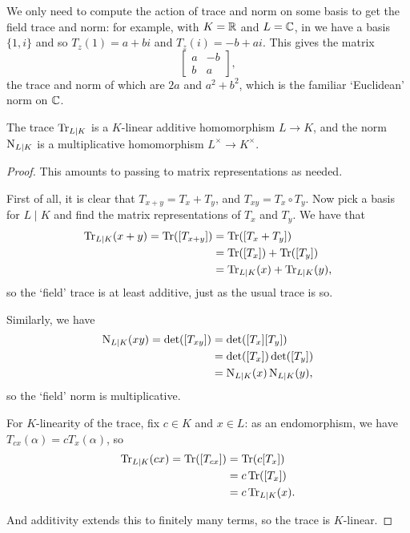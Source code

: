 We only need to compute the action of trace and norm on some basis to get the field trace and norm: for example, with $K=\mathbb{R}$ and $L=\mathbb{C}$, in we have a basis $\{1,i\}$ and so $T_z(1)=a+bi$ and $T_z(i)=-b+ai$. This gives the matrix
\[
	\begin{bmatrix}
		a & -b\\
		b & a
	\end{bmatrix},
\]
the trace and norm of which are $2a$ and $a^2+b^2$, which is the familiar `Euclidean' norm on $\mathbb{C}$.


\begin{proposition}
	The trace $\operatorname{Tr}_{L\mid K}$ is a $K$-linear additive homomorphism $L\to K$, and the norm $\operatorname{N}_{L\mid K}$ is a multiplicative homomorphism $L^\times\to K^\times$.
\end{proposition}
\begin{proof}
	This amounts to passing to matrix representations as needed.

	First of all, it is clear that $T_{x+y}=T_x+T_y$, and $T_{xy}=T_x\circ T_y$. Now pick a basis for $L\mid K$ and find the matrix representations of $T_x$ and $T_y$. We have that
	\begin{align*}
		\operatorname{Tr}_{L\mid K}(x+y)=\operatorname{Tr}([T_{x+y}])&=\operatorname{Tr}([T_x+T_y])\\
			&=\operatorname{Tr}([T_x])+\operatorname{Tr}([T_y])\\
			&= \operatorname{Tr}_{L\mid K}(x)+\operatorname{Tr}_{L\mid K}(y),
	\end{align*}
	so the `field' trace is at least additive, just as the usual trace is so.

	Similarly, we have
	\begin{align*}
		\operatorname{N}_{L\mid K}(xy) = \det([T_{xy}]) &= \det([T_x][T_y])\\
			&= \det([T_x])\det([T_y])\\
			&= \operatorname{N}_{L\mid K}(x)\operatorname{N}_{L\mid K}(y),
	\end{align*}
	so the `field' norm is multiplicative.

	For $K$-linearity of the trace, fix $c\in K$ and $x\in L$: as an endomorphism, we have $T_{cx}(\alpha)=c T_x(\alpha)$, so
	\begin{align*}
		\operatorname{Tr}_{L\mid K}(cx) = \operatorname{Tr}([T_{cx}]) &= \operatorname{Tr}(c[T_x])\\
			&= c\operatorname{Tr}([T_x])\\
			&= c \operatorname{Tr}_{L\mid K}(x).
	\end{align*}

	And additivity extends this to finitely many terms, so the trace is $K$-linear.
\end{proof}




